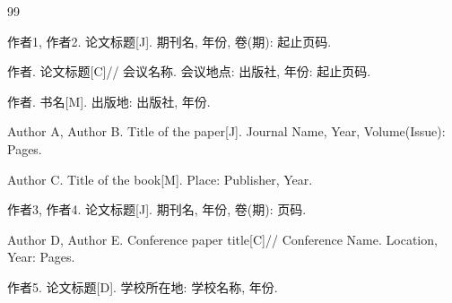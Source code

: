 
\begin{thebibliography}{99}

 作者1, 作者2. 论文标题[J]. 期刊名, 年份, 卷(期): 起止页码.

 作者. 论文标题[C]// 会议名称. 会议地点: 出版社, 年份: 起止页码.

 作者. 书名[M]. 出版地: 出版社, 年份.

 Author A, Author B. Title of the paper[J]. Journal Name, Year, Volume(Issue): Pages.

 Author C. Title of the book[M]. Place: Publisher, Year.

 作者3, 作者4. 论文标题[J]. 期刊名, 年份, 卷(期): 页码.

 Author D, Author E. Conference paper title[C]// Conference Name. Location, Year: Pages.

 作者5. 论文标题[D]. 学校所在地: 学校名称, 年份.

\end{thebibliography}
